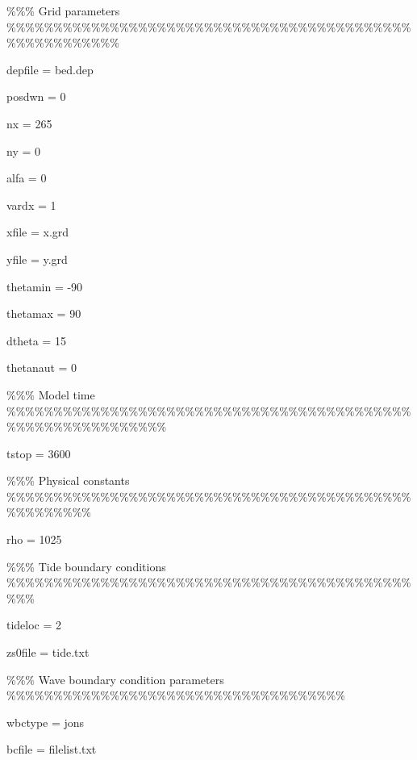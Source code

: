 \documentclass{article}
\begin{document}
\noindent \%\%\% Grid parameters \%\%\%\%\%\%\%\%\%\%\%\%\%\%\%\%\%\%\%\%\%\%\%\%\%\%\%\%\%\%\%\%\%\%\%\%\%\%\%\%\%\%\%\%\%\%\%\%\%\%\%\%\%\%\%

\noindent 

\noindent depfile      = bed.dep

\noindent posdwn       = 0

\noindent nx           = 265

\noindent ny           = 0

\noindent alfa         = 0

\noindent vardx        = 1

\noindent xfile        = x.grd

\noindent yfile        = y.grd

\noindent thetamin     = -90

\noindent thetamax     = 90

\noindent dtheta       = 15

\noindent thetanaut    = 0

\noindent 

\noindent \%\%\% Model time \%\%\%\%\%\%\%\%\%\%\%\%\%\%\%\%\%\%\%\%\%\%\%\%\%\%\%\%\%\%\%\%\%\%\%\%\%\%\%\%\%\%\%\%\%\%\%\%\%\%\%\%\%\%\%\%\%\%\%\%

\noindent 

\noindent tstop        = 3600

\noindent 

\noindent \%\%\% Physical constants \%\%\%\%\%\%\%\%\%\%\%\%\%\%\%\%\%\%\%\%\%\%\%\%\%\%\%\%\%\%\%\%\%\%\%\%\%\%\%\%\%\%\%\%\%\%\%\%\%\%\%\%

\noindent 

\noindent rho          = 1025

\noindent 

\noindent \%\%\% Tide boundary conditions \%\%\%\%\%\%\%\%\%\%\%\%\%\%\%\%\%\%\%\%\%\%\%\%\%\%\%\%\%\%\%\%\%\%\%\%\%\%\%\%\%\%\%\%\%\%

\noindent 

\noindent tideloc      = 2

\noindent zs0file      = tide.txt

\noindent 

\noindent \%\%\% Wave boundary condition parameters \%\%\%\%\%\%\%\%\%\%\%\%\%\%\%\%\%\%\%\%\%\%\%\%\%\%\%\%\%\%\%\%\%\%\%\%

\noindent 

\noindent wbctype      = jons

\noindent bcfile       = filelist.txt
\end{document}
